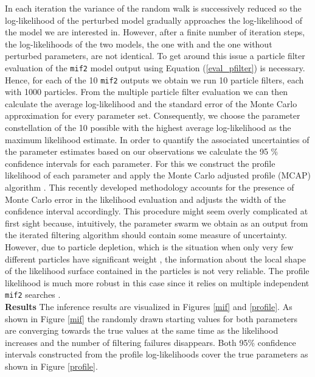 In each iteration  the variance of the random walk is successively reduced so the log-likelihood of the perturbed model gradually approaches the log-likelihood of  the model we are interested in. However, after a finite number of iteration steps, the log-likelihoods of the two models, the one with and the one without perturbed parameters,  are not identical. To get around this issue a particle filter evaluation of the \texttt{mif2} model output using Equation (\ref{eval_pfilter}) is necessary. Hence, for each  of the 10 \texttt{mif2} outputs we obtain we run 10 particle filters,  each with 1000 particles. From the multiple particle filter evaluation we can then calculate the average  log-likelihood and the standard error of the Monte Carlo approximation  for every parameter set. Consequently, we  choose the parameter constellation of the 10 possible with the highest average log-likelihood as the maximum likelihood  estimate.  
In order to quantify the associated uncertainties of the parameter estimates based on our observations we calculate the 95 \% confidence intervals for each parameter.  For this  we construct the profile likelihood of each parameter and apply the Monte Carlo adjusted profile (MCAP) algorithm \citep{Ionides2017}. This recently developed methodology accounts for the presence of Monte Carlo error in the likelihood evaluation and adjusts the width of the confidence interval  accordingly. 
This procedure might seem overly complicated at first sight because, intuitively, the parameter swarm we obtain as an output from the iterated filtering algorithm should contain some measure of uncertainty. However, due to particle depletion, which is the situation when only very few different particles have
significant weight \citep{Doucet2011}, the information about  the local shape of the likelihood surface contained in the particles is not very reliable. The profile likelihood is much more robust in this case since it relies on multiple independent \texttt{mif2} searches \citep{King2017}.\\
\newline
\textbf{Results} The inference results are visualized in Figures \ref{mif} and \ref{profile}. As shown in Figure \ref{mif} the randomly drawn starting values for both parameters are converging towards the true values at the same time as the likelihood increases and the number of filtering failures disappears. Both 95\% confidence intervals constructed from the profile log-likelihoods cover the true parameters as shown in Figure  \ref{profile}.


